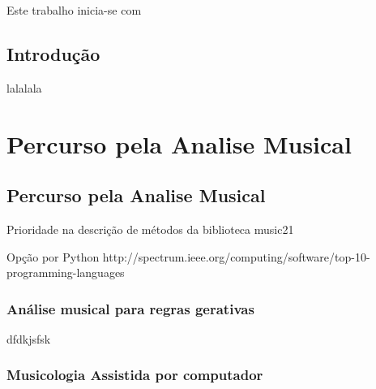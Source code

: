 \documentclass[
	12pt,				%
	openright,			%
	twoside,			%
	a4paper,			%
	english,			%
	french,				%
	spanish,			%
	brazil				%
	]{abntex2}
\begin{document}

\tableofcontents*
\cleardoublepage

%
%
%
%
%
%
%
\textual


Este trabalho inicia-se com 

\chapter*[Introdução]{Introdução}

lalalala


\part{Percurso pela Analise Musical }


\chapter{Percurso pela Analise Musical}

Prioridade na descrição de métodos da biblioteca music21

Opção por Python http://spectrum.ieee.org/computing/software/top-10-programming-languages 


\section{Análise musical para regras gerativas }

dfdkjsfsk


\section{Musicologia Assistida por computador}
\end{document}
